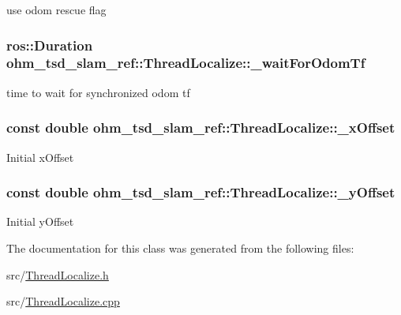 use odom rescue flag \hypertarget{classohm__tsd__slam__ref_1_1ThreadLocalize_a5f43425ab2bb540e72205ef83e37d4ff}{
\subsubsection[{\-\_\-wait\-For\-Odom\-Tf}]{\setlength{\rightskip}{0pt plus 5cm}ros\-::\-Duration ohm\-\_\-tsd\-\_\-slam\-\_\-ref\-::\-Thread\-Localize\-::\-\_\-wait\-For\-Odom\-Tf\hspace{0.3cm}{\ttfamily [private]}}}\label{classohm__tsd__slam__ref_1_1ThreadLocalize_a5f43425ab2bb540e72205ef83e37d4ff}
time to wait for synchronized odom tf \hypertarget{classohm__tsd__slam__ref_1_1ThreadLocalize_a2bfa898645a8b505fbc317829da277cf}{
\subsubsection[{\-\_\-x\-Offset}]{\setlength{\rightskip}{0pt plus 5cm}const double ohm\-\_\-tsd\-\_\-slam\-\_\-ref\-::\-Thread\-Localize\-::\-\_\-x\-Offset\hspace{0.3cm}{\ttfamily [private]}}}\label{classohm__tsd__slam__ref_1_1ThreadLocalize_a2bfa898645a8b505fbc317829da277cf}
Initial x\-Offset \hypertarget{classohm__tsd__slam__ref_1_1ThreadLocalize_afd9255f70ea924f91b0e628d20245803}{
\subsubsection[{\-\_\-y\-Offset}]{\setlength{\rightskip}{0pt plus 5cm}const double ohm\-\_\-tsd\-\_\-slam\-\_\-ref\-::\-Thread\-Localize\-::\-\_\-y\-Offset\hspace{0.3cm}{\ttfamily [private]}}}\label{classohm__tsd__slam__ref_1_1ThreadLocalize_afd9255f70ea924f91b0e628d20245803}
Initial y\-Offset 

The documentation for this class was generated from the following files\-:\begin{DoxyCompactItemize}
\item 
src/\hyperlink{ThreadLocalize_8h}{Thread\-Localize.\-h}\item 
src/\hyperlink{ThreadLocalize_8cpp}{Thread\-Localize.\-cpp}\end{DoxyCompactItemize}
